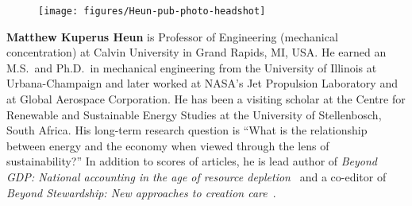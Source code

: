 \setlength{\intextsep}{-7pt}%
\setlength{\columnsep}{8pt}%
\begin{figure}
  \begin{center}
    \texttt{[image: figures/Heun-pub-photo-headshot]}
  \end{center}
\end{figure}
\textbf{Matthew Kuperus Heun} is Professor of Engineering 
(mechanical concentration)
at Calvin University in Grand Rapids, MI, USA.
He earned an M.S.\ and Ph.D.\ in mechanical engineering from 
the University of Illinois at Urbana-Champaign and 
later worked at NASA's Jet Propulsion Laboratory and at Global Aerospace Corporation. 
He has been a visiting scholar at the Centre for Renewable and Sustainable Energy Studies 
at the University of Stellenbosch, South Africa. 
His long-term research question is 
``What is the relationship between energy and the economy when viewed through the lens of sustainability?''
In addition to scores of articles, he is lead author of 
\emph{Beyond GDP: National accounting in the age of resource depletion}~\citep{Heun:2015aa} 
and a co-editor of
\emph{Beyond Stewardship: New approaches to creation care}~\citep{Warners:2019aa}.
